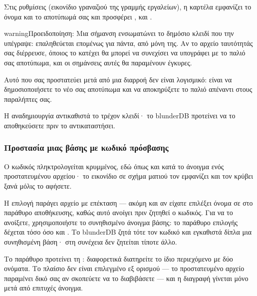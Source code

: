 \documentclass[letterpaper,10pt,greek]{sphinxmanual}
\begin{document}
\sphinxAtStartPar
Στις ρυθμίσεις (εικονίδιο γραναζιού της γραμμής εργαλείων), η καρτέλα  εμφανίζει το όνομα και το αποτύπωμά σας και προσφέρει ,  και .

\begin{sphinxadmonition}{warning}{Προειδοποίηση:}
\sphinxAtStartPar
{} Μια σήμανση ενσωματώνει το δημόσιο κλειδί που την υπέγραψε: επαληθεύεται επομένως για πάντα, από μόνη της. Αν το αρχείο ταυτότητάς σας διέρρευσε, όποιος το κατέχει θα μπορεί να συνεχίσει να υπογράφει με το παλιό σας αποτύπωμα, και οι σημάνσεις αυτές θα παραμένουν έγκυρες.

\sphinxAtStartPar
Αυτό που σας προστατεύει μετά από μια διαρροή δεν είναι λογισμικό: είναι να δημοσιοποιήσετε το νέο σας αποτύπωμα και να αποκηρύξετε το παλιό απέναντι στους παραλήπτες σας.

\sphinxAtStartPar
Η αναδημιουργία αντικαθιστά το τρέχον κλειδί· το blunderDB προτείνει να το αποθηκεύσετε πριν το αντικαταστήσει.
\end{sphinxadmonition}


\subsubsection{Προστασία μιας βάσης με κωδικό πρόσβασης}
\label{\detokenize{manuel:proteger-une-base-par-un-mot-de-passe}}
\sphinxAtStartPar
Ο κωδικός πληκτρολογείται κρυμμένος, εδώ όπως και κατά το άνοιγμα ενός προστατευμένου αρχείου· το εικονίδιο σε σχήμα ματιού τον εμφανίζει  και τον κρύβει ξανά μόλις το αφήσετε.

\sphinxAtStartPar
Η επιλογή  παράγει αρχείο με επέκταση  — ακόμη και αν είχατε επιλέξει όνομα σε  στο παράθυρο αποθήκευσης, καθώς αυτό ανοίγει πριν ζητηθεί ο κωδικός. Για να το ανοίξετε, χρησιμοποιήστε το συνηθισμένο άνοιγμα βάσης: το παράθυρο επιλογής δέχεται τόσο  όσο και . Το blunderDB ζητά τότε τον κωδικό και εγκαθιστά δίπλα μια συνηθισμένη βάση· στη συνέχεια δεν ζητείται τίποτε άλλο.

\sphinxAtStartPar
Το παράθυρο προτείνει τη : διαφορετικά διατηρείτε το ίδιο περιεχόμενο με δύο ονόματα. Το πλαίσιο δεν είναι επιλεγμένο εξ ορισμού — το προστατευμένο αρχείο παραμένει δικό σας αν σκοπεύετε να το διαβιβάσετε — και η διαγραφή γίνεται μόνο μετά από επιτυχές άνοιγμα.
\end{document}
